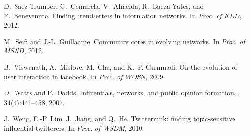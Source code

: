 \documentclass[letterpaper]{www13-companion-accepted}
\begin{document}
{\begin{thebibliography}{10}
D.~Saez-Trumper, G.~Comarela, V.~Almeida, R.~Baeza-Yates, and F.~Benevenuto.
\newblock Finding trendsetters in information networks.
\newblock In {\em Proc. of KDD}, 2012.

M.~Seifi and J.-L. Guillaume.
\newblock Community cores in evolving networks.
\newblock In {\em Proc. of MSND}, 2012.

B.~Viswanath, A.~Mislove, M.~Cha, and K.~P. Gummadi.
\newblock On the evolution of user interaction in facebook.
\newblock In {\em Proc. of WOSN}, 2009.

D.~Watts and P.~Dodds.
\newblock Influentials, networks, and public opinion formation.
, 34(4):441--458, 2007.

J.~Weng, E.-P. Lim, J.~Jiang, and Q.~He.
\newblock Twitterrank: finding topic-sensitive influential twitterers.
\newblock In {\em Proc. of WSDM}, 2010.

\end{thebibliography}


}
\end{document}
